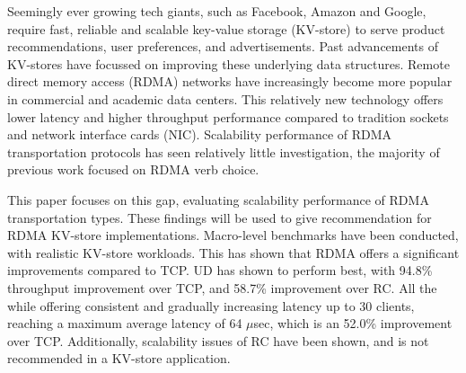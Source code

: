 


\begin{abstracts}        %

    Seemingly ever growing tech giants, such as Facebook, Amazon and Google, require fast, reliable and scalable key-value storage (KV-store) to serve product recommendations, user preferences, and advertisements.
    Past advancements of KV-stores have focussed on improving these underlying data structures.
    Remote direct memory access (RDMA) networks have increasingly become more popular in commercial and academic data centers.
    This relatively new technology offers lower latency and higher throughput performance compared to tradition sockets and network interface cards (NIC).
    Scalability performance of RDMA transportation protocols has seen relatively little investigation, the majority of previous work focused on RDMA verb choice.

    This paper focuses on this gap, evaluating scalability performance of RDMA transportation types.
    These findings will be used to give recommendation for RDMA KV-store implementations.
    Macro-level benchmarks have been conducted, with realistic KV-store workloads.
    This has shown that RDMA offers a significant improvements compared to TCP.
    UD has shown to perform best, with 94.8\% throughput improvement over TCP, and 58.7\% improvement over RC.
    All the while offering consistent and gradually increasing latency up to 30 clients, reaching a maximum average latency of 64 $\mu$sec, which is an 52.0\% improvement over TCP.
    Additionally, scalability issues of RC have been shown, and is not recommended in a KV-store application.

\end{abstracts}


